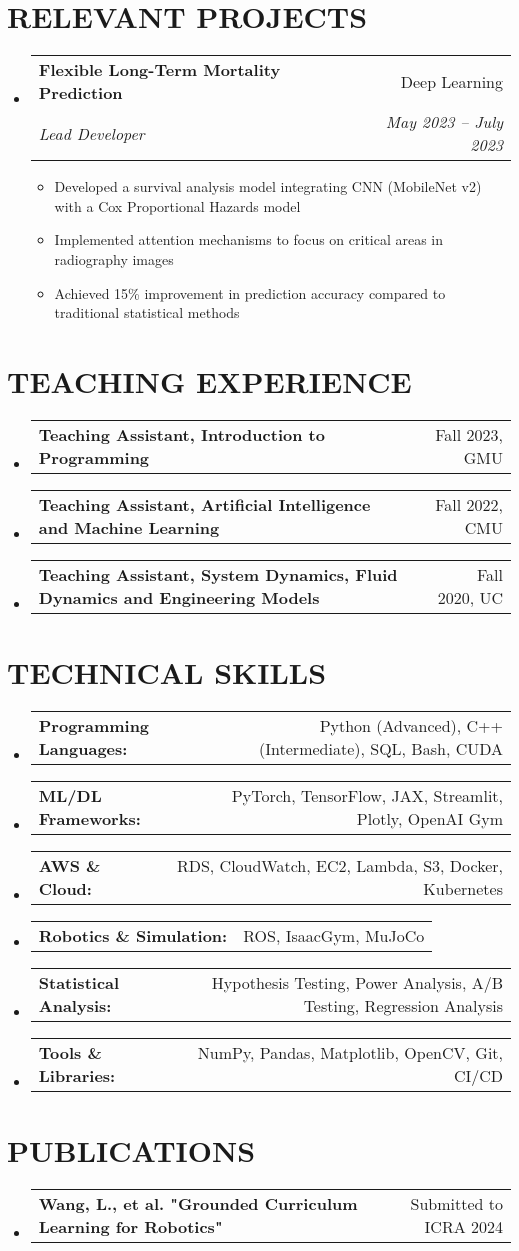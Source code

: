 \documentclass[letterpaper,10pt]{article}
\makeatletter
\newcommand{\resumeItem}[1]{
  \item\small{
    #1 \vspace{-2pt}
  }
}
\newcommand{\resumeSubheading}[4]{
  \vspace{-2pt}\item
    \begin{tabular*}{0.97\textwidth}{l@{\extracolsep{\fill}}r}
      \textbf{#1} & #2 \\
      \textit{\small#3} & \textit{\small #4} \\
    \end{tabular*}\vspace{-7pt}
}
\newcommand{\resumeSubSubheading}[2]{
    \item
    \begin{tabular*}{0.97\textwidth}{l@{\extracolsep{\fill}}r}
      \textbf{#1} & #2 \\
    \end{tabular*}\vspace{-7pt}
}
\newcommand{\resumeSubHeadingListStart}{\begin{itemize}[leftmargin=0.15in, label={}]}
\newcommand{\resumeSubHeadingListEnd}{\end{itemize}}
\newcommand{\resumeItemListStart}{\begin{itemize}[leftmargin=0.25in, label=\tiny$\bullet$]}
\newcommand{\resumeItemListEnd}{\end{itemize}\vspace{-5pt}}
\makeatother
\begin{document}
\section{RELEVANT PROJECTS}
  \resumeSubHeadingListStart
    \resumeSubheading
      {Flexible Long-Term Mortality Prediction}{Deep Learning}
      {Lead Developer}{May 2023 – July 2023}
      \resumeItemListStart
        \resumeItem{Developed a survival analysis model integrating CNN (MobileNet v2) with a Cox Proportional Hazards model}
        \resumeItem{Implemented attention mechanisms to focus on critical areas in radiography images}
        \resumeItem{Achieved 15\% improvement in prediction accuracy compared to traditional statistical methods}
      \resumeItemListEnd
  \resumeSubHeadingListEnd

\section{TEACHING EXPERIENCE}
  \resumeSubHeadingListStart
    \resumeSubSubheading
      {Teaching Assistant, Introduction to Programming}{Fall 2023, GMU}
    \resumeSubSubheading
      {Teaching Assistant, Artificial Intelligence and Machine Learning}{Fall 2022, CMU}
    \resumeSubSubheading
      {Teaching Assistant, System Dynamics, Fluid Dynamics and Engineering Models}{Fall 2020, UC}
  \resumeSubHeadingListEnd

\section{TECHNICAL SKILLS}
 \resumeSubHeadingListStart
   \resumeSubSubheading{Programming Languages:}{Python (Advanced), C++ (Intermediate), SQL, Bash, CUDA}
   \resumeSubSubheading{ML/DL Frameworks:}{PyTorch, TensorFlow, JAX, Streamlit, Plotly, OpenAI Gym}
   \resumeSubSubheading{AWS \& Cloud:}{RDS, CloudWatch, EC2, Lambda, S3, Docker, Kubernetes}
   \resumeSubSubheading{Robotics \& Simulation:}{ROS, IsaacGym, MuJoCo}
   \resumeSubSubheading{Statistical Analysis:}{Hypothesis Testing, Power Analysis, A/B Testing, Regression Analysis}
   \resumeSubSubheading{Tools \& Libraries:}{NumPy, Pandas, Matplotlib, OpenCV, Git, CI/CD}
 \resumeSubHeadingListEnd

\section{PUBLICATIONS}
  \resumeSubHeadingListStart
    \resumeSubSubheading{Wang, L., et al. "Grounded Curriculum Learning for Robotics"}{Submitted to ICRA 2024}
  \resumeSubHeadingListEnd
\end{document}

